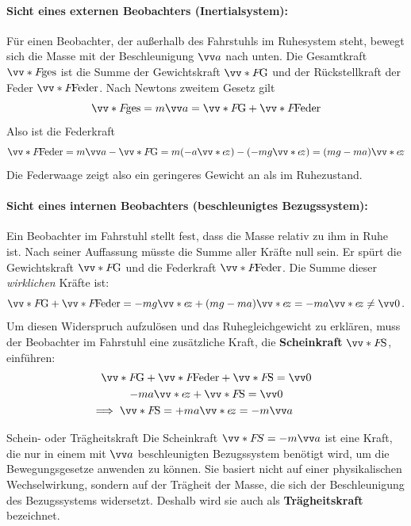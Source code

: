 \paragraph{Sicht eines externen Beobachters (Inertialsystem):}
Für einen Beobachter, der außerhalb des Fahrstuhls im Ruhesystem steht, bewegt sich die Masse mit der Beschleunigung $\ivec{a}$ nach unten. Die Gesamtkraft $\ivecS{F}{\text{ges}}$ ist die Summe der Gewichtskraft $\ivecS{F}{\text{G}}$ und der Rückstellkraft der Feder $\ivecS{F}{\text{Feder}}$. Nach Newtons zweitem Gesetz gilt
\begin{equation}
    \ivecS{F}{\text{ges}} = m\ivec{a} = \ivecS{F}{\text{G}} + \ivecS{F}{\text{Feder}}
\end{equation}
Also ist die Federkraft
\begin{equation}
    \ivecS{F}{\text{Feder}} = m\ivec{a} - \ivecS{F}{\text{G}} = m(-a\ivecS{e}{z}) - (-mg\ivecS{e}{z}) = (mg - ma)\ivecS{e}{z}
\end{equation}
Die Federwaage zeigt also ein geringeres Gewicht an als im Ruhezustand. \\

\paragraph{Sicht eines internen Beobachters (beschleunigtes Bezugssystem):}
Ein Beobachter im Fahrstuhl stellt fest, dass die Masse relativ zu ihm in Ruhe ist. Nach seiner Auffassung müsste die Summe aller Kräfte null sein. Er spürt die Gewichtskraft $\ivecS{F}{\text{G}}$ und die Federkraft $\ivecS{F}{\text{Feder}}$. Die Summe dieser \textit{wirklichen} Kräfte ist:
\begin{equation}
    \ivecS{F}{\text{G}} + \ivecS{F}{\text{Feder}} = -mg\ivecS{e}{z} + (mg - ma)\ivecS{e}{z} = -ma\ivecS{e}{z} \neq \ivec{0} \mDot
\end{equation} 
Um diesen Widerspruch aufzulösen und das Ruhegleichgewicht zu erklären, muss der Beobachter im Fahrstuhl eine zusätzliche Kraft, die \textbf{Scheinkraft} $\ivecS{F}{\text{S}}$, einführen:
\begin{gather}
    \ivecS{F}{\text{G}} + \ivecS{F}{\text{Feder}} + \ivecS{F}{\text{S}} = \ivec{0} \\
    -ma\ivecS{e}{z} + \ivecS{F}{\text{S}} = \ivec{0} \\
    \llap{$\implies$\;} \ivecS{F}{\text{S}} = +ma\ivecS{e}{z} = -m\ivec{a} 
\end{gather}

\begin{rememberbox}{Schein- oder Trägheitskraft}
Die Scheinkraft $\ivecS{F}{S} = -m\ivec{a}$ ist eine Kraft, die nur in einem mit $\ivec{a}$ beschleunigten Bezugssystem benötigt wird, um die Bewegungsgesetze anwenden zu können. Sie basiert nicht auf einer physikalischen Wechselwirkung, sondern auf der Trägheit der Masse, die sich der Beschleunigung des Bezugssystems widersetzt. Deshalb wird sie auch als \textbf{Trägheitskraft} bezeichnet.
\end{rememberbox}

